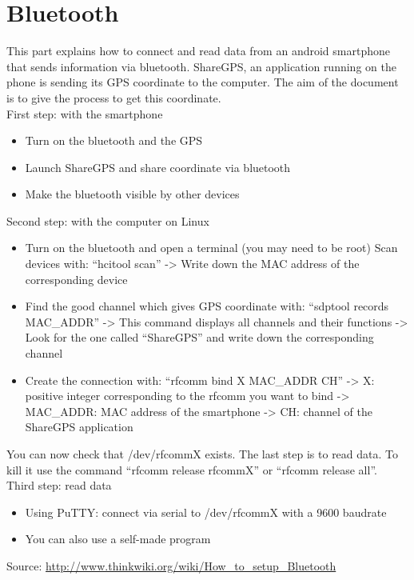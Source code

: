 \section{Bluetooth}

This part explains how to connect and read data from an android smartphone that sends information via bluetooth. ShareGPS, an application running on the phone is sending its GPS coordinate to the computer. The aim of the document is to give the process to get this coordinate.\\

First step: with the smartphone\\

\begin{itemize}
 \item Turn on the bluetooth and the GPS
 \item Launch ShareGPS and share coordinate via bluetooth
 \item Make the bluetooth visible by other devices
\end{itemize}

Second step: with the computer on Linux\\

\begin{itemize}
   \item  Turn on the bluetooth and open a terminal (you may need to be root)
   Scan devices with: ``hcitool scan''
   -> Write down the MAC address of the corresponding device
   \item Find the good channel which gives GPS coordinate with: ``sdptool records MAC\_ADDR''
   -> This command displays all channels and their functions
   -> Look for the one called ``ShareGPS'' and write down the corresponding channel
   \item Create the connection with: ``rfcomm bind X MAC\_ADDR CH''
    -> X: positive integer corresponding to the rfcomm you want to bind
    -> MAC\_ADDR: MAC address of the smartphone
    -> CH: channel of the ShareGPS application
\end{itemize}

You can now check that /dev/rfcommX exists. The last step is to read data.
To kill it use the command ``rfcomm release rfcommX'' or ``rfcomm release all''.\\

Third step: read data\\
\begin{itemize}
  \item Using PuTTY: connect via serial to /dev/rfcommX with a 9600 baudrate
  \item You can also use a self-made program
\end{itemize}

Source: \url{http://www.thinkwiki.org/wiki/How\_to\_setup\_Bluetooth}
